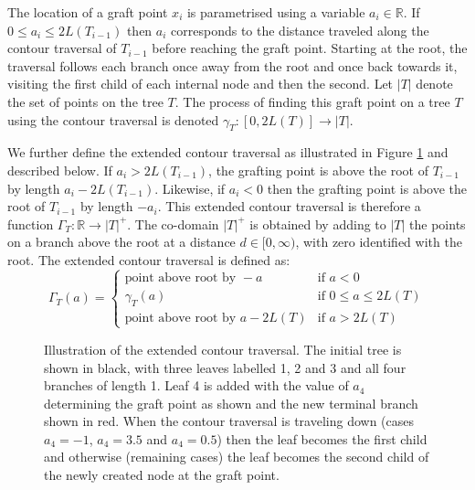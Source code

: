 \documentclass{article}
\begin{document}
The location of a
graft point $x_i$ is parametrised using a variable $a_i \in \mathbb{R}$.
If $0\leq a_i \leq 2L(T_{i-1})$ then $a_i$ corresponds to the distance traveled
along the contour traversal of $T_{i-1}$ before reaching the graft point.
Starting at the root, the traversal follows each branch once away from the root and 
once back towards it, visiting the first child of each internal node and then the second. 
Let $|T|$ denote the set of points on the tree $T$.
The process of finding this graft point on a tree $T$ using the contour traversal is denoted
$
\gamma_T: [0,2L(T)] \rightarrow |T|
$.

We further define the extended contour traversal as illustrated 
in Figure \ref{fig:contour} and described below.
If $a_i>2L(T_{i-1})$, the grafting point is above the root of $T_{i-1}$ by length $a_i-2L(T_{i-1})$.
Likewise, if $a_i<0$ then the grafting point is above the root of $T_{i-1}$ by length $-a_i$.
This extended contour traversal is therefore a function $\Gamma_{T}: \mathbb{R} \rightarrow
|T|^+$. The co-domain $|T|^+$ is obtained by adding to $|T|$ the points on a branch above
the root at a distance $d \in [0,\infty)$, with zero identified with the root. 
The extended contour traversal is defined as:
\begin{equation}
\label{eq:contour-extended}
\Gamma_{T}(a)=
\begin{cases} 
      \text{point above root by }-a & \text{if } a<0 \\ 
      \gamma_{T}(a) & \text{if } 0\leq a \leq 2L(T) \\ 
      \text{point above root by }a-2L(T) &\text{if }a>2L(T) 
   \end{cases}
\end{equation}

\begin{figure}[t]
\caption{Illustration of the extended contour traversal. The initial tree is shown in black, with three 
leaves labelled 1, 2 and 3 and all four branches of length 1.
Leaf 4 is added with the value of $a_4$ determining the graft point as shown and the new terminal branch shown in red. When the contour traversal
is traveling down (cases $a_4=-1$, $a_4=3.5$ and $a_4=0.5$) then
the leaf becomes the first child and otherwise (remaining cases)
the leaf becomes the second child of the newly created node at the graft point.
\label{fig:contour}}
\end{figure}
\end{document}
